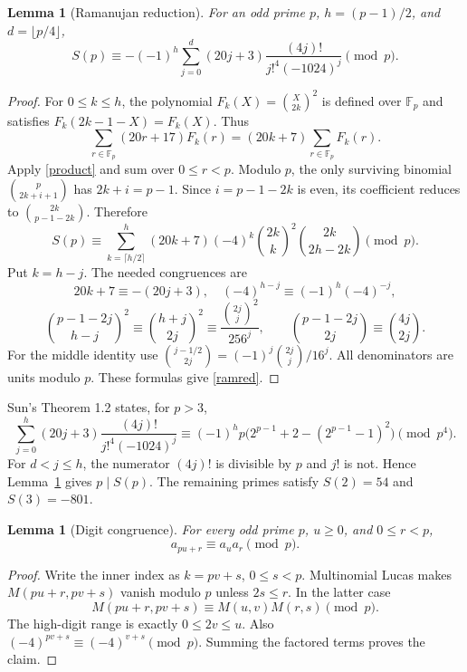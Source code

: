 \documentclass[11pt,a4paper]{article}
\newtheorem{lemma}[theorem]{Lemma}
\theoremstyle{remark}\newtheorem{remark}[theorem]{Remark}
\newcommand{\F}{\mathbb F}
\begin{document}
\begin{lemma}[Ramanujan reduction]\label{primelemma}
For an odd prime \(p\), \(h=(p-1)/2\), and \(d=\lfloor p/4\rfloor\),
\begin{equation}\label{ramred}
 S(p)\equiv-(-1)^h\sum_{j=0}^{d}
       (20j+3)\frac{(4j)!}{j!^4(-1024)^j}\pmod p .
\end{equation}
\end{lemma}
\begin{proof}
For \(0\le k\le h\), the polynomial \(F_k(X)=\binom X{2k}^2\)
is defined over \(\F_p\) and satisfies
\(F_k(2k-1-X)=F_k(X)\). Thus
\[
 \sum_{r\in\F_p}(20r+17)F_k(r)
 =(20k+7)\sum_{r\in\F_p}F_k(r).
\]
Apply \eqref{product} and sum over \(0\le r<p\). Modulo \(p\), the
only surviving binomial \(\binom p{2k+i+1}\) has \(2k+i=p-1\).
Since \(i=p-1-2k\) is even, its coefficient reduces to
\(\binom{2k}{p-1-2k}\). Therefore
\[
 S(p)\equiv\sum_{k=\lceil h/2\rceil}^{h}
 (20k+7)(-4)^k\binom{2k}k^2\binom{2k}{2h-2k}\pmod p .
\]
Put \(k=h-j\). The needed congruences are
\[
 20k+7\equiv-(20j+3),\quad
 (-4)^{h-j}\equiv(-1)^h(-4)^{-j},
\]
\[
 \binom{p-1-2j}{h-j}^{\!2}
 \equiv\binom{h+j}{2j}^{\!2}
 \equiv\frac{\binom{2j}j^2}{256^j},\qquad
 \binom{p-1-2j}{2j}\equiv\binom{4j}{2j}.
\]
For the middle identity use
\(\binom{j-1/2}{2j}=(-1)^j\binom{2j}j/16^j\).
All denominators are units modulo \(p\). These formulas give
\eqref{ramred}.
\end{proof}

Sun's Theorem 1.2 \cite{SunRefinement} states, for \(p>3\),
\[
 \sum_{j=0}^{h}(20j+3)\frac{(4j)!}{j!^4(-1024)^j}
 \equiv(-1)^h p\bigl(2^{p-1}+2-(2^{p-1}-1)^2\bigr)\pmod {p^4}.
\]
For \(d<j\le h\), the numerator \((4j)!\) is divisible by \(p\)
and \(j!\) is not. Hence Lemma~\ref{primelemma} gives \(p\mid S(p)\).
The remaining primes satisfy \(S(2)=54\) and \(S(3)=-801\).

\begin{lemma}[Digit congruence]\label{lucas}
For every odd prime \(p\), \(u\ge0\), and \(0\le r<p\),
\[
                 a_{pu+r}\equiv a_u a_r\pmod p.
\]
\end{lemma}
\begin{proof}
Write the inner index as \(k=pv+s\), \(0\le s<p\).
Multinomial Lucas makes \(M(pu+r,pv+s)\) vanish modulo \(p\)
unless \(2s\le r\). In the latter case
\[
 M(pu+r,pv+s)\equiv M(u,v)M(r,s)\pmod p.
\]
The high-digit range is exactly \(0\le2v\le u\).
Also \((-4)^{pv+s}\equiv(-4)^{v+s}\pmod p\).
Summing the factored terms proves the claim.
\end{proof}
\end{document}
